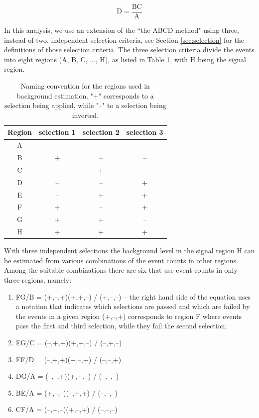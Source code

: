 \begin{equation}
\text{D} = \frac {\text{BC}}{\text{A}}
\end{equation}


In this analysis, we use an extension of the ``the ABCD method" using
 three, instead of two, independent selection criteria, see Section \ref{sec:selection} for the definitions of those selection criteria. 
The three selection criteria divide the events into eight
regions (A, B, C, ..., H), as listed in Table \ref{tab:regions}, with  H being the signal region.

\begin{table}[htbp]
\centering
\caption{Naming convention for the regions used in background estimation. "+" corresponds to a selection 
being applied, while "--" to a selection being inverted. \label{tab:regions}}
\vspace{0.1cm}
\begin{tabular}{cccc}
 \hline
  Region & selection 1 & selection 2 & selection 3 \\
 \hline
 A & -- & -- & -- \\
 B & + & -- & -- \\
 C & -- & + & -- \\
 D & -- & -- & + \\
 E & -- & + & + \\
 F & + & -- & + \\
 G & + & + & -- \\
 H & + & + & + \\
\hline
\end{tabular} 
\end{table}

With three independent selections the background level in the signal region H can be estimated from various combinations
of the event counts in other regions. Among the suitable combinations 
there are six that use event counts in only
three regions, namely:
\begin{enumerate}
 \item FG/B = (+,--,+)(+,+,--) / (+,--,--) -- the right hand side of the equation uses
 a notation that indicates which selections are passed and which are failed by 
 the events in a given region
 \ie (+,--,+) corresponds to region F where events pass the first and third selection,
 while they fail the second selection;
 \item EG/C = (--,+,+)(+,+,--) / (--,+,--)
 \item EF/D = (--,+,+)(+,--,+) / (--,--,+)
 \item DG/A = (--,--,+)(+,+,--) / (--,--,--)
 \item BE/A = (+,--,--)(--,+,+) / (--,--,--)
 \item CF/A = (--,+,--)(+,--,+) / (--,--,--)
\end{enumerate}


